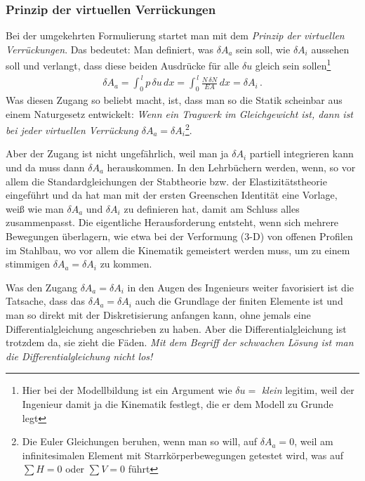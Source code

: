 {\textcolor{sectionTitleBlue}{\subsubsection*{Prinzip der virtuellen Verr\"{u}ckungen}}}
Bei der umgekehrten Formulierung startet man mit dem {\em Prinzip der virtuellen Verr\"{u}ckungen\/}. Das bedeutet: Man definiert, was $\delta A_a$ sein soll, wie $\delta A_i$ aussehen soll und verlangt, dass diese beiden Ausdr\"{u}cke f\"{u}r alle $\delta u$ gleich sein sollen\footnote{Hier bei der Modellbildung ist ein Argument wie $\delta u =$ {\em klein\/} legitim, weil der Ingenieur damit ja die Kinematik festlegt, die er dem Modell zu Grunde legt}
\begin{align}\label{Eq141}
\delta A_a = \int_0^{\,l} p\,\delta u\,dx = \int_0^{\,l} \frac{N\, \delta N}{EA}\,dx = \delta A_i\,.
\end{align}
Was diesen Zugang so beliebt macht, ist, dass man so die Statik scheinbar aus einem \glq Naturgesetz\grq{} entwickelt: {\em Wenn ein Tragwerk im Gleichgewicht ist, dann ist bei jeder virtuellen Verr\"{u}ckung $\delta A_a = \delta A_i$\/}\footnote{Die Euler Gleichungen beruhen, wenn man so will, auf $\delta A_a = 0$, weil am infinitesimalen Element mit Starrk\"{o}rperbewegungen getestet wird, was auf $\sum H = 0$ oder $\sum V = 0$ f\"{u}hrt}.

Aber der Zugang ist nicht ungef\"{a}hrlich, weil man ja $\delta A_i$ partiell integrieren kann und da muss dann  $\delta A_a$ herauskommen. In den Lehrb\"{u}chern werden, wenn, so vor allem die Standardgleichungen der Stabtheorie bzw. der Elastizit\"{a}tstheorie eingef\"{u}hrt und da hat man mit der ersten Greenschen Identit\"{a}t eine Vorlage, wei{\ss} wie man $\delta A_a$ und $\delta A_i$ zu definieren hat, damit am Schluss alles zusammenpasst. Die eigentliche Herausforderung entsteht, wenn sich mehrere Bewegungen \glq \"{u}berlagern\grq{}, wie etwa bei der Verformung (3-D) von offenen Profilen im Stahlbau, wo vor allem die Kinematik gemeistert werden muss, um zu einem stimmigen $\delta A_a = \delta A_i$ zu kommen.

Was den Zugang $\delta A_a = \delta A_i $ in den Augen des Ingenieurs weiter favorisiert ist die Tatsache, dass das $\delta A_a = \delta A_i $ auch die Grundlage der finiten Elemente ist und man so direkt mit der Diskretisierung anfangen kann, ohne jemals eine Differentialgleichung angeschrieben zu haben. Aber die Differentialgleichung ist trotzdem \glq da\grq{}, sie zieht die F\"{a}den. {\em Mit dem Begriff der schwachen L\"{o}sung ist man die Differentialgleichung nicht los!\/}

